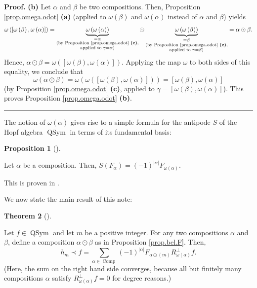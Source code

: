 \documentclass[numbers=enddot,12pt,final,onecolumn,notitlepage,abstracton]{scrartcl}%
\theoremstyle{definition}
\newtheorem{theo}{Theorem}[section]
\newenvironment{theorem}[1][]
{\begin{theo}[#1]\begin{leftbar}}
{\end{leftbar}\end{theo}}
\newtheorem{prop}[theo]{Proposition}
\newenvironment{proposition}[1][]
{\begin{prop}[#1]\begin{leftbar}}
{\end{leftbar}\end{prop}}
\newenvironment{proof}[1][Proof]{\noindent\textbf{#1.} }{\ \rule{0.5em}{0.5em}}
\newenvironment{verlong}{}{}
\let\sumnonlimits\sum
\renewcommand{\sum}{\sumnonlimits\limits}
\begin{document}
\begin{verlong}
\begin{proof}
\textbf{(b)} Let $\alpha$ and $\beta$ be two compositions. Then, Proposition
\ref{prop.omega.odot} \textbf{(a)} (applied to $\omega\left(  \beta\right)  $
and $\omega\left(  \alpha\right)  $ instead of $\alpha$ and $\beta$) yields%
\[
\omega\left(  \left[  \omega\left(  \beta\right)  ,\omega\left(
\alpha\right)  \right]  \right)  =\underbrace{\omega\left(  \omega\left(
\alpha\right)  \right)  }_{\substack{=\alpha\\\text{(by Proposition
\ref{prop.omega.odot} \textbf{(c)},}\\\text{applied to }\gamma=\alpha\text{)}%
}}\odot\underbrace{\omega\left(  \omega\left(  \beta\right)  \right)
}_{\substack{=\beta\\\text{(by Proposition \ref{prop.omega.odot}
\textbf{(c)},}\\\text{applied to }\gamma=\beta\text{)}}}=\alpha\odot\beta.
\]
Hence, $\alpha\odot\beta=\omega\left(  \left[  \omega\left(  \beta\right)
,\omega\left(  \alpha\right)  \right]  \right)  $. Applying the map $\omega$
to both sides of this equality, we conclude that%
\[
\omega\left(  \alpha\odot\beta\right)  =\omega\left(  \omega\left(  \left[
\omega\left(  \beta\right)  ,\omega\left(  \alpha\right)  \right]  \right)
\right)  =\left[  \omega\left(  \beta\right)  ,\omega\left(  \alpha\right)
\right]
\]
(by Proposition \ref{prop.omega.odot} \textbf{(c)}, applied to $\gamma=\left[
\omega\left(  \beta\right)  ,\omega\left(  \alpha\right)  \right]  $). This
proves Proposition \ref{prop.omega.odot} \textbf{(b)}.
\end{proof}
\end{verlong}

The notion of $\omega\left(  \alpha\right)  $ gives rise to a simple formula
for the antipode $S$ of the Hopf algebra $\operatorname*{QSym}$ in terms of
its fundamental basis:

\begin{proposition}
\label{prop.S.F}Let $\alpha$ be a composition. Then, $S\left(  F_{\alpha
}\right)  =\left(  -1\right)  ^{\left\vert \alpha\right\vert }F_{\omega\left(
\alpha\right)  }$.
\end{proposition}

This is proven in \cite[Proposition 5.2.15]{Reiner}.

We now state the main result of this note:

\begin{theorem}
\label{thm.hmDless}Let $f\in\operatorname*{QSym}$ and let $m$ be a positive
integer. For any two compositions $\alpha$ and $\beta$, define a composition
$\alpha\odot\beta$ as in Proposition \ref{prop.bel.F}. Then,%
\[
h_{m}\left.  \prec\right.  f=\sum_{\alpha\in\operatorname*{Comp}}\left(
-1\right)  ^{\left\vert \alpha\right\vert }F_{\alpha\odot\left(  m\right)
}R_{\omega\left(  \alpha\right)  }^{\perp}f.
\]
(Here, the sum on the right hand side converges, because all but finitely many
compositions $\alpha$ satisfy $R_{\omega\left(  \alpha\right)  }^{\perp}f=0$
for degree reasons.)
\end{theorem}
\end{document}
